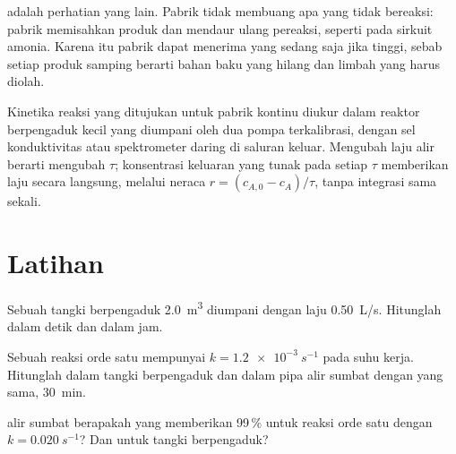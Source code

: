  adalah perhatian yang lain. Pabrik tidak membuang apa yang
tidak bereaksi: pabrik memisahkan produk dan mendaur ulang pereaksi,
seperti pada sirkuit amonia. Karena itu pabrik dapat menerima  yang sedang saja jika  tinggi, sebab setiap
produk samping berarti bahan baku yang hilang dan limbah yang harus
diolah.

\begin{inthelab}
Kinetika reaksi yang ditujukan untuk pabrik kontinu diukur dalam reaktor
berpengaduk kecil yang diumpani oleh dua pompa terkalibrasi, dengan sel
konduktivitas atau spektrometer daring di saluran keluar. Mengubah laju
alir berarti mengubah $\tau$; konsentrasi keluaran yang tunak pada setiap
$\tau$ memberikan laju secara langsung, melalui neraca
$r = (c_{A,0} - c_A)/\tau$, tanpa integrasi sama sekali.
\end{inthelab}

\section{Latihan}

\begin{exercise}[$\star$]\label{exo:b2:continuous-reactors:1}
Sebuah tangki berpengaduk \qty{2.0}{m^3} diumpani dengan laju
\qty{0.50}{L/s}. Hitunglah  dalam detik dan dalam jam.
\end{exercise}

\begin{exercise}[$\star$]\label{exo:b2:continuous-reactors:2}
Sebuah reaksi orde satu mempunyai $k = \qty{1.2e-3}{s^{-1}}$ pada suhu
kerja. Hitunglah  dalam tangki berpengaduk dan dalam pipa alir
sumbat dengan  yang sama, \qty{30}{min}.
\end{exercise}

\begin{exercise}[$\star$]\label{exo:b2:continuous-reactors:3}
 alir sumbat berapakah yang memberikan  99\,\% untuk
reaksi orde satu dengan $k = \qty{0.020}{s^{-1}}$? Dan untuk tangki
berpengaduk?
\end{exercise}

